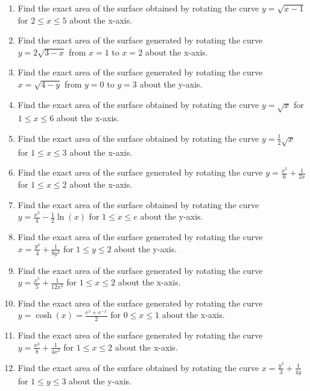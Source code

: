 \documentclass{article}
\begin{document}
\begin{enumerate}
    \item Find the exact area of the surface obtained by rotating the curve $y = \sqrt{x-1}$ for $2 \le x \le 5$ about the x-axis.
    
    \item Find the exact area of the surface generated by rotating the curve $y=2\sqrt{3-x}$ from $x=1$ to $x=2$ about the x-axis.
    
    \item Find the exact area of the surface generated by rotating the curve $x=\sqrt{4-y}$ from $y=0$ to $y=3$ about the y-axis.
    
    \item Find the exact area of the surface obtained by rotating the curve $y=\sqrt{x}$ for $1 \le x \le 6$ about the x-axis.
    
    \item Find the exact area of the surface obtained by rotating the curve $y=\frac{1}{2}\sqrt{x}$ for $1 \le x \le 3$ about the x-axis.

    \item Find the exact area of the surface generated by rotating the curve $y = \frac{x^3}{6} + \frac{1}{2x}$ for $1 \le x \le 2$ about the x-axis.
    
    \item Find the exact area of the surface obtained by rotating the curve $y = \frac{x^2}{4} - \frac{1}{2}\ln(x)$ for $1 \le x \le e$ about the y-axis.
    
    \item Find the exact area of the surface generated by rotating the curve $x = \frac{y^4}{4} + \frac{1}{8y^2}$ for $1 \le y \le 2$ about the y-axis.

    \item Find the exact area of the surface generated by rotating the curve $y = \frac{x^5}{5} + \frac{1}{12x^3}$ for $1 \le x \le 2$ about the x-axis.
    
    \item Find the exact area of the surface generated by rotating the curve $y=\cosh(x) = \frac{e^x+e^{-x}}{2}$ for $0 \le x \le 1$ about the x-axis.
    
    \item Find the exact area of the surface generated by rotating the curve $y = \frac{x^4}{8} + \frac{1}{4x^2}$ for $1 \le x \le 2$ about the x-axis.
    
    \item Find the exact area of the surface obtained by rotating the curve $x = \frac{y^3}{3} + \frac{1}{4y}$ for $1 \le y \le 3$ about the y-axis.
    

\end{enumerate}
\end{document}
